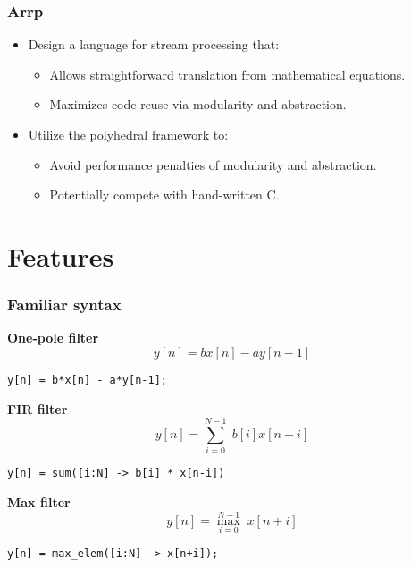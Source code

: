 \documentclass{beamer}
\begin{document}
\begin{frame}
\frametitle{Arrp}

\begin{itemize}
\item Design a language for stream processing that:
\begin{itemize}
  \item Allows straightforward translation from mathematical equations.
  \item Maximizes code reuse via modularity and abstraction.
\end{itemize}
\item Utilize the polyhedral framework to:
\begin{itemize}
  \item Avoid performance penalties of modularity and abstraction.
  \item Potentially compete with hand-written C.
\end{itemize}
\end{itemize}

\end{frame}

\section{Features}

\begin{frame}[fragile]
\frametitle{Familiar syntax}

\textbf{One-pole filter}
\[y[n] = b x[n] - a y[n-1]\]
\begin{center}
\begin{BVerbatim}
y[n] = b*x[n] - a*y[n-1];
\end{BVerbatim}
\end{center}

\textbf{FIR filter}
\[y[n] = \sum_{i = 0}^{N-1} \; b[i] x[n-i]\]
\begin{center}
\begin{BVerbatim}
y[n] = sum([i:N] -> b[i] * x[n-i])
\end{BVerbatim}
\end{center}

\textbf{Max filter}
\[y[n] = \max_{i = 0}^{N-1} \; x[n+i]\]
\begin{center}
\begin{BVerbatim}
y[n] = max_elem([i:N] -> x[n+i]);
\end{BVerbatim}
\end{center}

\end{frame}
\end{document}
